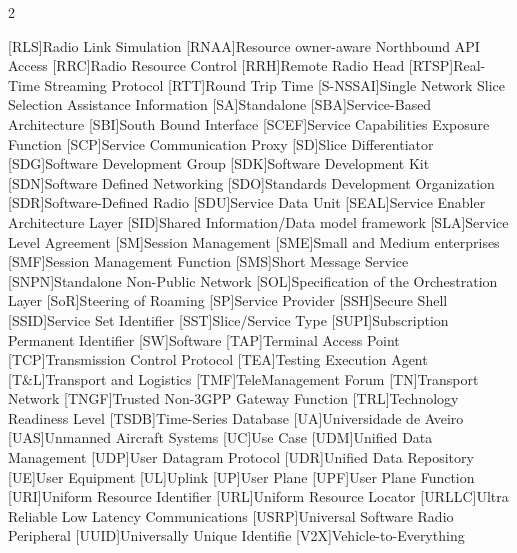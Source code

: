 \begin{multicols}{2}
\begin{acronym}[AAAAAAAAA]
	[RLS]{Radio Link Simulation}
	[RNAA]{Resource owner-aware Northbound API Access}
	[RRC]{Radio Resource Control}
	[RRH]{Remote Radio Head}
	[RTSP]{Real-Time Streaming Protocol}
	[RTT]{Round Trip Time}
	[S-NSSAI]{Single Network Slice Selection Assistance Information} 
	[SA]{Standalone} 
	[SBA]{Service-Based Architecture}
	[SBI]{South Bound Interface}
	[SCEF]{Service Capabilities Exposure Function}
	[SCP]{Service Communication Proxy}
    [SD]{Slice Differentiator}
	[SDG]{Software Development Group}
	[SDK]{Software Development Kit}
	[SDN]{Software Defined Networking}
	[SDO]{Standards Development Organization}
	[SDR]{Software-Defined Radio}
	[SDU]{Service Data Unit}
	[SEAL]{Service Enabler Architecture Layer}
	[SID]{Shared Information/Data model framework}
	[SLA]{Service Level Agreement}
	[SM]{Session Management}
	[SME]{Small and Medium enterprises}
	[SMF]{Session Management Function}
	[SMS]{Short Message Service}
	[SNPN]{Standalone Non-Public Network}
	[SOL]{Specification of the Orchestration Layer}
	[SoR]{Steering of Roaming}
	[SP]{Service Provider}
	[SSH]{Secure Shell}
	[SSID]{Service Set Identifier}
	[SST]{Slice/Service Type}
    [SUPI]{Subscription Permanent Identifier}
	[SW]{Software}
	[TAP]{Terminal Access Point}
	[TCP]{Transmission Control Protocol}
	[TEA]{Testing Execution Agent}
	[T\&L]{Transport and Logistics}
	[TMF]{TeleManagement Forum}
    [TN]{Transport Network}
	[TNGF]{Trusted Non-3GPP Gateway Function}
	[TRL]{Technology Readiness Level}
    [TSDB]{Time-Series Database}
	[UA]{Universidade de Aveiro}
	[UAS]{Unmanned Aircraft Systems}
	[UC]{Use Case}
	[UDM]{Unified Data Management}
	[UDP]{User Datagram Protocol}
	[UDR]{Unified Data Repository}
	[UE]{User Equipment}
	[UL]{Uplink}
	[UP]{User Plane}
	[UPF]{User Plane Function}
    [URI]{Uniform Resource Identifier}
    [URL]{Uniform Resource Locator}
	[URLLC]{Ultra Reliable Low Latency Communications}
	[USRP]{Universal Software Radio Peripheral}
    [UUID]{Universally Unique Identifie}
	[V2X]{Vehicle-to-Everything}

\end{acronym}
\end{multicols}
